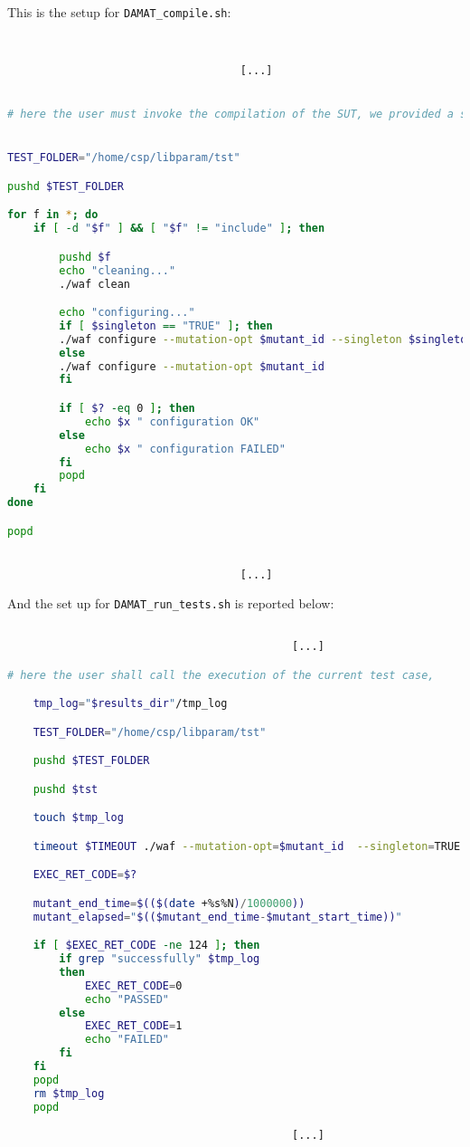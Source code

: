 This is the setup for \texttt{DAMAT\_compile.sh}:

\begin{lstlisting}[language=bash]


									[...]


# here the user must invoke the compilation of the SUT, we provided a simple example.


TEST_FOLDER="/home/csp/libparam/tst"

pushd $TEST_FOLDER

for f in *; do
    if [ -d "$f" ] && [ "$f" != "include" ]; then

        pushd $f
        echo "cleaning..."
        ./waf clean

        echo "configuring..."
        if [ $singleton == "TRUE" ]; then
        ./waf configure --mutation-opt $mutant_id --singleton $singleton
        else
        ./waf configure --mutation-opt $mutant_id
        fi

        if [ $? -eq 0 ]; then
            echo $x " configuration OK"
        else
            echo $x " configuration FAILED"
        fi
        popd
    fi
done

popd


									[...]


\end{lstlisting}

And the set up for \texttt{DAMAT\_run\_tests.sh} is reported below:

\begin{lstlisting}[language=bash]

											[...]

# here the user shall call the execution of the current test case,

    tmp_log="$results_dir"/tmp_log

    TEST_FOLDER="/home/csp/libparam/tst"

    pushd $TEST_FOLDER

    pushd $tst

    touch $tmp_log

    timeout $TIMEOUT ./waf --mutation-opt=$mutant_id  --singleton=TRUE 2>&1 | tee $tmp_log

    EXEC_RET_CODE=$?

    mutant_end_time=$(($(date +%s%N)/1000000))
    mutant_elapsed="$(($mutant_end_time-$mutant_start_time))"

    if [ $EXEC_RET_CODE -ne 124 ]; then
        if grep "successfully" $tmp_log
        then
            EXEC_RET_CODE=0
            echo "PASSED"
        else
            EXEC_RET_CODE=1
            echo "FAILED"
        fi
    fi
    popd
    rm $tmp_log
    popd

											[...]

\end{lstlisting}


